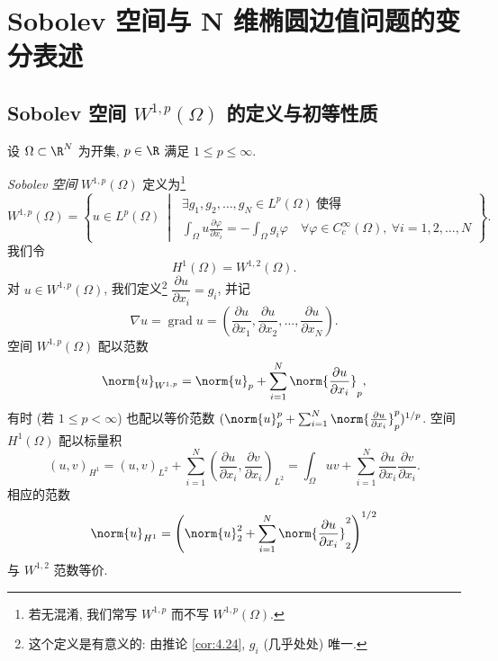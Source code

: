 
\chapter{Sobolev 空间与 N 维椭圆边值问题的变分表述}
\label{chap:9}

\section{
Sobolev 空间 $W^{1,p}(\Omega)$ 的定义与初等性质}
\label{sec:9.1}

设 $\Omega\subset\R^N$ 为开集, $p\in\R$ 满足 $1\le p\le\infty$.

\begin{definition}
\emph{Sobolev 空间} $W^{1,p}(\Omega)$ 定义为\footnote{若无混淆, 我们常写
$W^{1,p}$ 而不写 $W^{1,p}(\Omega)$.}
\begin{equation*}
W^{1,p}(\Omega)=\left\{u\in L^p(\Omega)\ \middle|\
\begin{array}{l}
\exists g_1,g_2,\dots,g_N\in L^p(\Omega)\ \text{使得}\\
\displaystyle\int_\Omega u\frac{\partial\varphi}{\partial x_i}
=-\int_\Omega g_i\varphi\quad\forall\varphi\in C_c^\infty(\Omega),\
\forall i=1,2,\dots,N
\end{array}
\right\}.
\end{equation*}
我们令
\begin{equation*}
H^1(\Omega)=W^{1,2}(\Omega).
\end{equation*}
对 $u\in W^{1,p}(\Omega)$, 我们定义\footnote{这个定义是有意义的: 由推论
 \ref{cor:4.24}, $g_i$ (几乎处处) 唯一.}
$\dfrac{\partial u}{\partial x_i}=g_i$, 并记
\begin{equation*}
\nabla u=\operatorname{grad}u=
\left(\frac{\partial u}{\partial x_1},\frac{\partial u}{\partial x_2},
\dots,\frac{\partial u}{\partial x_N}\right).
\end{equation*}
空间 $W^{1,p}(\Omega)$ 配以范数
\begin{equation*}
\norm{u}_{W^{1,p}}=\norm{u}_p+\sum_{i=1}^N
\norm{\frac{\partial u}{\partial x_i}}_p,
\end{equation*}
有时 (若 $1\le p<\infty$) 也配以等价范数
$(\norm{u}_p^p+\sum_{i=1}^N\norm{\frac{\partial u}{\partial x_i}}_p^p)^{1/p}$.
空间 $H^1(\Omega)$ 配以标量积
\begin{equation*}
(u,v)_{H^1}=(u,v)_{L^2}+\sum_{i=1}^N
\left(\frac{\partial u}{\partial x_i},\frac{\partial v}{\partial x_i}\right)_{L^2}
=\int_\Omega uv+\sum_{i=1}^N\frac{\partial u}{\partial x_i}
\frac{\partial v}{\partial x_i}.
\end{equation*}
相应的范数
\begin{equation*}
\norm{u}_{H^1}=\left(\norm{u}_2^2+\sum_{i=1}^N
\norm{\frac{\partial u}{\partial x_i}}_2^2\right)^{1/2}
\end{equation*}
与 $W^{1,2}$ 范数等价.
\end{definition}

